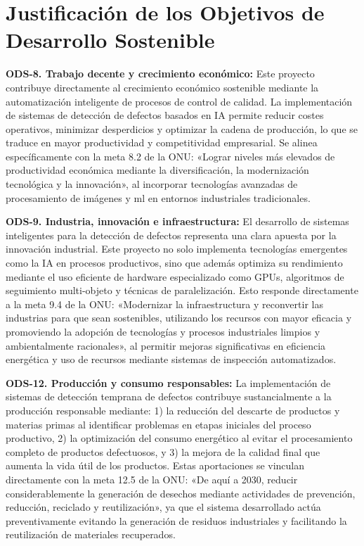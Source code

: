 \documentclass[11pt,spanish,listoffigures,listoftables]{tfgetsinf}
\begin{document}
   \section*{Justificación de los Objetivos de Desarrollo Sostenible} \label{sec:justificacion_ods}

   \textbf{ODS-8. Trabajo decente y crecimiento económico:} Este proyecto contribuye directamente al crecimiento económico sostenible mediante la automatización inteligente de procesos de control de calidad. La implementación de sistemas de detección de defectos basados en IA permite reducir costes operativos, minimizar desperdicios y optimizar la cadena de producción, lo que se traduce en mayor productividad y competitividad empresarial. Se alinea específicamente con la meta 8.2 de la ONU: «Lograr niveles más elevados de productividad económica mediante la diversificación, la modernización tecnológica y la innovación», al incorporar tecnologías avanzadas de procesamiento de imágenes y \gls{ml} en entornos industriales tradicionales.

   \textbf{ODS-9. Industria, innovación e infraestructura:} El desarrollo de sistemas inteligentes para la detección de defectos representa una clara apuesta por la innovación industrial. Este proyecto no solo implementa tecnologías emergentes como la IA en procesos productivos, sino que además optimiza su rendimiento mediante el uso eficiente de hardware especializado como GPUs, algoritmos de seguimiento multi-objeto y técnicas de paralelización. Esto responde directamente a la meta 9.4 de la ONU: «Modernizar la infraestructura y reconvertir las industrias para que sean sostenibles, utilizando los recursos con mayor eficacia y promoviendo la adopción de tecnologías y procesos industriales limpios y ambientalmente racionales», al permitir mejoras significativas en eficiencia energética y uso de recursos mediante sistemas de inspección automatizados.

   \textbf{ODS-12. Producción y consumo responsables:} La implementación de sistemas de detección temprana de defectos contribuye sustancialmente a la producción responsable mediante: 1) la reducción del descarte de productos y materias primas al identificar problemas en etapas iniciales del proceso productivo, 2) la optimización del consumo energético al evitar el procesamiento completo de productos defectuosos, y 3) la mejora de la calidad final que aumenta la vida útil de los productos. Estas aportaciones se vinculan directamente con la meta 12.5 de la ONU: «De aquí a 2030, reducir considerablemente la generación de desechos mediante actividades de prevención, reducción, reciclado y reutilización», ya que el sistema desarrollado actúa preventivamente evitando la generación de residuos industriales y facilitando la reutilización de materiales recuperados.
\end{document}
